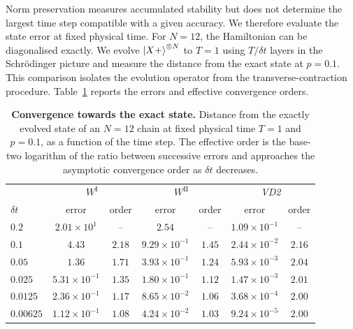 Norm preservation measures accumulated stability but does not determine the largest time step compatible with a given accuracy. We therefore evaluate the state error at fixed physical time. For $N=12$, the Hamiltonian can be diagonalised exactly. We evolve $\ket{X+}^{\otimes N}$ to $T=1$ using $T/\delta t$ layers in the Schr\"odinger picture and measure the distance from the exact state at $p=0.1$. This comparison isolates the evolution operator from the transverse-contraction procedure. Table~\ref{tab:mpo_order} reports the errors and effective convergence orders.

\begin{table}[!htbp]
  \centering
  \begin{tabular}{lcccccc}
    \hline
               & \multicolumn{2}{c}{$W^{\mathrm{I}}$} & \multicolumn{2}{c}{$W^{\mathrm{II}}$} & \multicolumn{2}{c}{\textit{VD2}}                                         \\
    $\delta t$ & error                                & order                                 & error                            & order  & error               & order  \\
    \hline
    $0.2$      & $2.01\times10^{1}$                   & --                                    & $2.54$                           & --     & $1.09\times10^{-1}$ & --     \\
    $0.1$      & $4.43$                               & $2.18$                                & $9.29\times10^{-1}$              & $1.45$ & $2.44\times10^{-2}$ & $2.16$ \\
    $0.05$     & $1.36$                               & $1.71$                                & $3.93\times10^{-1}$              & $1.24$ & $5.93\times10^{-3}$ & $2.04$ \\
    $0.025$    & $5.31\times10^{-1}$                  & $1.35$                                & $1.80\times10^{-1}$              & $1.12$ & $1.47\times10^{-3}$ & $2.01$ \\
    $0.0125$   & $2.36\times10^{-1}$                  & $1.17$                                & $8.65\times10^{-2}$              & $1.06$ & $3.68\times10^{-4}$ & $2.00$ \\
    $0.00625$  & $1.12\times10^{-1}$                  & $1.08$                                & $4.24\times10^{-2}$              & $1.03$ & $9.24\times10^{-5}$ & $2.00$ \\
    \hline
  \end{tabular}
  \caption{\textbf{Convergence towards the exact state.} Distance from the exactly evolved state of an $N=12$ chain at fixed physical time $T=1$ and $p=0.1$, as a function of the time step. The effective order is the base-two logarithm of the ratio between successive errors and approaches the asymptotic convergence order as $\delta t$ decreases.}
  \label{tab:mpo_order}
\end{table}

